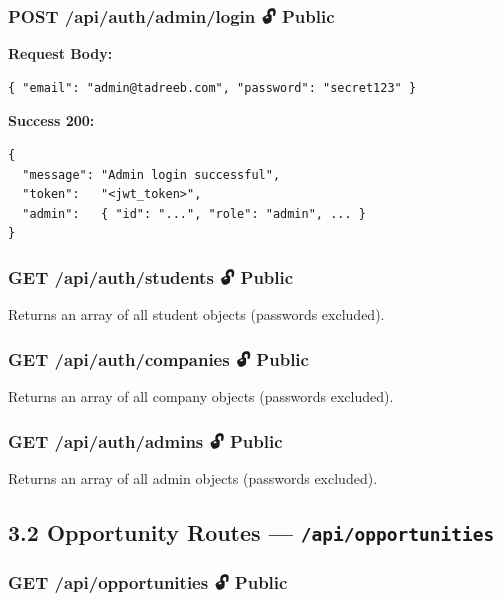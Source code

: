 \documentclass[12pt,a4paper]{article}
\begin{document}
\vspace{0.5cm}

\subsubsection*{POST /api/auth/admin/login \quad 🔓 Public}

\textbf{Request Body:}
\begin{lstlisting}[language={}]
{ "email": "admin@tadreeb.com", "password": "secret123" }
\end{lstlisting}

\textbf{Success 200:}
\begin{lstlisting}[language={}]
{
  "message": "Admin login successful",
  "token":   "<jwt_token>",
  "admin":   { "id": "...", "role": "admin", ... }
}
\end{lstlisting}

\vspace{0.5cm}

\subsubsection*{GET /api/auth/students \quad 🔓 Public}
Returns an array of all student objects (passwords excluded).

\subsubsection*{GET /api/auth/companies \quad 🔓 Public}
Returns an array of all company objects (passwords excluded).

\subsubsection*{GET /api/auth/admins \quad 🔓 Public}
Returns an array of all admin objects (passwords excluded).

\vspace{0.5cm}

\subsection*{3.2 Opportunity Routes — \texttt{/api/opportunities}}

\subsubsection*{GET /api/opportunities \quad 🔓 Public}
\end{document}
